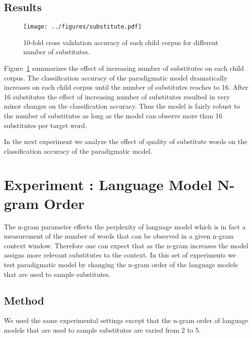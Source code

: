 \subsection{Results}
\begin{figure}[ht]
  \centering
  \texttt{[image: ../figures/substitute.pdf]}
  \caption{10-fold cross validation accuracy of each child corpus for different
  number of substitutes.}
  \label{fig:substitutes}
\end{figure}
Figure~\ref{fig:substitutes} summarizes the effect of increasing number of
substitutes on each child corpus. The classification accuracy of the
paradigmatic model dramatically increases on each child corpus until the number
of substitutes reaches to 16.   After 16 substitutes the effect of increasing
number of substitutes resulted in very minor changes on the classification
accuracy.  Thus the model is fairly robust to the number of substitutes as long
as the model can observe more than 16 substitutes per target word.

In the next experiment we analyze the effect of quality of substitute words on
the classification accuracy of the paradigmatic model.

\section{Experiment : Language Model N-gram Order}
\label{s:exp_ngram}
The n-gram parameter effects the perplexity of language model which is in fact
a measurement of the number of words that can be observed in a given n-gram
context window.  Therefore one can expect that as the n-gram increases the
model assigns more relevant substitutes to the context.  In this set of
experiments we test paradigmatic model by changing the n-gram order of the
language models that are used to sample substitutes.

\subsection{Method}

We used the same experimental settings except that the n-gram order of language
models that are used to sample substitutes are varied from 2 to 5.

